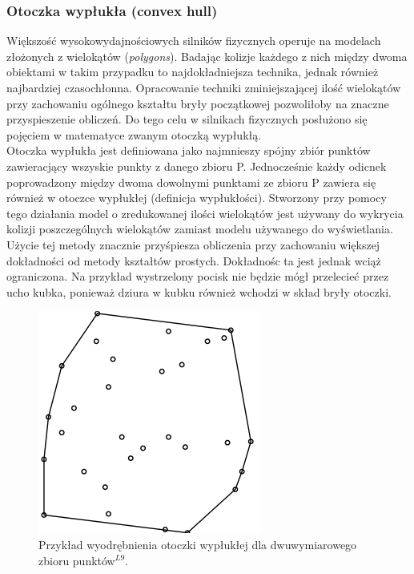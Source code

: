 \subsubsection{Otoczka wypłukła (convex hull)}
Większość wysokowydajnościowych silników fizycznych operuje na modelach
złożonych z wielokątów (\emph{polygons}). Badając kolizje każdego z nich między
dwoma obiektami w takim przypadku to najdokładniejsza technika, jednak również
najbardziej czasochłonna. Opracowanie techniki zminiejszającej ilość wielokątów
przy zachowaniu ogólnego kształtu bryły początkowej pozwoliłoby na znaczne
przyspieszenie obliczeń. Do tego celu w silnikach fizycznych posłużono się
pojęciem w matematyce zwanym otoczką wypłukłą. \\
Otoczka wypłukła jest definiowana jako najmnieszy spójny zbiór punktów
zawieracjący wszyskie punkty z danego zbioru P. Jednocześnie każdy odicnek
poprowadzony między dwoma dowolnymi punktami ze zbioru P zawiera się również w
otoczce wypłukłej (definicja wypłukłości). Stworzony przy pomocy tego działania
model o zredukowanej ilości wielokątów jest używany do wykrycia kolizji
poszczególnych wielokątów zamiast modelu używanego do wyświetlania. Użycie tej
metody znacznie przyśpiesza obliczenia przy zachowaniu większej dokładności od
metody kształtów prostych. Dokładnośc ta jest jednak wciąż ograniczona. Na
przykład wystrzelony pocisk nie będzie mógł przelecieć przez ucho kubka,
ponieważ dziura w kubku również wchodzi w skład bryły otoczki.

\begin{figure}[H]
\centering
\includegraphics[scale=0.5]{./img/convexhull.png}
\caption{Przykład wyodrębnienia otoczki wypłukłej dla dwuwymiarowego zbioru
punktów$ ^{L9} $.}
\label{fig:convexhull}
\end{figure}

